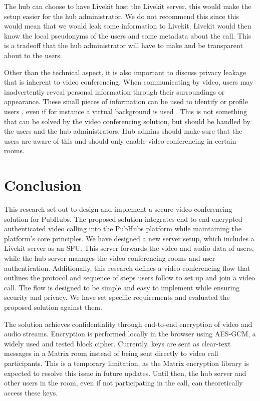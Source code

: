 \documentclass{report}
\begin{document}
The hub can choose to have Livekit host the Livekit server, this would make the setup easier for the hub administrator.
We do not recommend this since this would mean that we would leak some information to Livekit. Livekit would then know
the local pseudonyms of the users and some metadata about the call. This is a tradeoff that the hub administrator will
have to make and be transparent about to the users.

Other than the technical aspect, it is also important to discuss privacy leakage that is inherent to video conferencing.
When communicating by video, users may inadvertently reveal personal information through their surroundings or
appearance. These small pieces of information can be used to identify or profile users \cite{kagan_zooming_2024},
even if for instance a virtual background is used \cite{hilgefort_spying_2021}. This is not something that can be solved by the video conferencing solution, but
should be handled by the users and the hub administrators. Hub admins should make sure that the users are aware of
this and should only enable video conferencing in certain rooms.

\chapter{Conclusion}
This research set out to design and implement a secure video conferencing solution for PubHubs. The proposed
solution integrates end-to-end encrypted authenticated video calling into the PubHubs platform while maintaining
the platform's core principles. We have designed a new server setup, which includes a Livekit server as an SFU.
This server forwards the video and audio data of users, while the hub server manages the video conferencing rooms
and user authentication. Additionally, this research defines a video conferencing flow that outlines the protocol
and sequence of steps users follow to set up and join a video call. The flow is designed to be simple and easy to
implement while ensuring security and privacy. We have set specific requirements and evaluated the proposed
solution against them.

The solution achieves confidentiality through end-to-end encryption of video and audio streams. Encryption is
performed locally in the browser using AES-GCM, a widely used and tested block cipher. Currently, keys are sent as
clear-text messages in a Matrix room instead of being sent directly to video call participants. This is a temporary
limitation, as the Matrix encryption library is expected to resolve this issue in future updates. Until then, the
hub server and other users in the room, even if not participating in the call, can theoretically access these keys.
\end{document}
